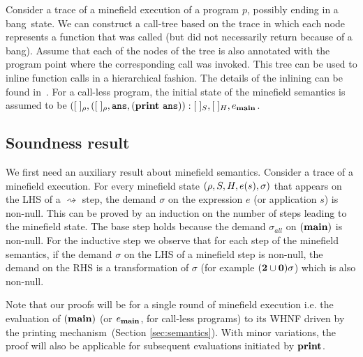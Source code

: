 \documentclass[9pt]{sigplanconf}
\newcommand{\bang}{\mbox{\sc bang}}
\begin{document}
Consider a trace  of a minefield execution of a  program $p$, possibly
ending in  a \bang\ state. We  can construct a call-tree  based on the
trace in  which each node represents  a function that was  called (but
did not necessarily  return because of a \bang).  Assume  that each of
the nodes of  the tree is also annotated with  the program point where
the corresponding call  was invoked.  This tree can be  used to inline
function calls in a hierarchical fashion.  The details of the inlining
can be found in~\cite{asati14lgc}.
For  a
call-less program,  the initial state of  the minefield
semantics  is  assumed  to  be  $([\;]_\rho,([\;]_\rho,
\mathbf{\mbox{\tt ans}},      (\mathbf{print}~\mathbf{\mbox{\tt ans}})):[\;]_{S}     ,      [\;]_{H},
e_{\mathbf{main}}$.
   
 
\subsection{Soundness result}
We first need an auxiliary  result about minefield semantics. Consider
a trace of  a minefield execution.  For every  minefield state $(\rho,
S,   H,  e(s),   \sigma)$   that   appears  on   the   LHS  of   a
$\rightsquigarrow$ step, the demand $\sigma$ on the expression $e$ (or
application $s$) is  non-null.  This can be proved by  an induction on
the number  of steps leading  to the  minefield state.  The  base step
holds   because  the   demand   $\sigma_{\mathit{all}}$   on  $(\mathbf{main})$   is
non-null. For the inductive step we  observe that for each step of the
minefield semantics, if the demand $\sigma$  on the LHS of a minefield
step  is non-null,  the  demand  on the  RHS  is  a transformation  of
$\sigma$ (for example $({\mathbf{2}}\cup\mathbf{0})\sigma$) which is also non-null.

Note that our proofs will be for a single round of minefield execution
i.e.  the evaluation of $(\mathbf{main})$ (or $e_{\mathbf{main}}$, for call-less
programs)  to   its  WHNF  driven  by   the  printing  mechanism~(Section
\ref{sec:semantics}).  With  minor variations,  the proof will  also be
applicable for subsequent evaluations initiated by $\mathbf{print}$.
\end{document}
